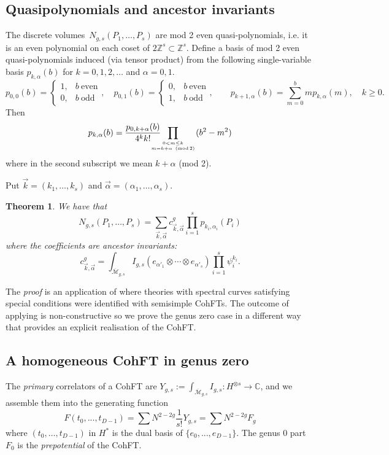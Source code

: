 \documentclass[11pt]{article}
\def\be{\begin{equation}}
\def\ee{\end{equation}}
\def\1N{${\cal N}=1$}
\newcommand{\bz}{\mathbb{Z}}
\newcommand{\modm}{\mathcal{M}}
\theoremstyle{plain}
\newtheorem{theorem}{Theorem}
\theoremstyle{definition}
\let\text=\mathrm
\newcommand{\bc}{\mathbb{C}}
\newcommand {\dvol}{discrete volumes}%
\begin{document}
\subsection{Quasipolynomials and ancestor invariants}\label{ss:quasi}
The \dvol\  $N_{g,s}(P_1,\dots,P_s)$ are mod 2 even quasi-polynomials, i.e. it is an even polynomial on each coset of $2\bz^s\subset\bz^s$.   Define a basis of mod 2 even quasi-polynomials induced (via tensor product) from the following single-variable basis $p_{k,\alpha}(b)$ for $k=0,1,2,\dots$ and $\alpha=0,1$.
$$p_{0,0}(b)=\left\{\begin{array}{cc}1,&b \text{\ even}\\0,&b \text{\ odd}\end{array}\right.,\quad p_{0,1}(b)=\left\{\begin{array}{cc}0,&b \text{\ even}\\1,&b \text{\ odd}\end{array}\right.,\qquad p_{k+1,\alpha}(b)=\sum_{m=0}^b m p_{k,\alpha}(m),\quad k\geq 0.$$
Then
\be
p_{k,\alpha}(b)=\frac{p_{0,k+\alpha}(b)}{4^kk!}\hspace{-.5cm}\prod_{{0<m\le k\atop m=k+\alpha\ (\mathrm{mod\,}2)}}(b^2-m^2)
\label{pk1}
\ee
where in the second subscript we mean $k+\alpha$ (mod 2).  


Put $\vec{k}=(k_1,\dots,k_s)$ and  $\vec{\alpha}=(\alpha_1,\dots,\alpha_s)$.
\begin{theorem} \label{th:cohft} We have that
$$N_{g,s}(P_1,\dots,P_s)=\sum_{\vec{k},\vec{\alpha}} c^g_{\vec{k},\vec{\alpha}} \prod_{i=1}^s p_{k_i,\alpha_i}(P_i)$$
where the coefficients are ancestor invariants:
\be
c^g_{\vec{k},\vec{\alpha}}=\int_{\overline{\modm}_{g,s}}I_{g,s}(e_{\alpha'_1}\otimes\cdots\otimes e_{\alpha'_s})\prod_{i=1}^s\psi_i^{k_i}.
\label{ancestor}
\ee 
\end{theorem}
The \emph{proof} is an application of \cite{DOSSIde} where theories with spectral curves satisfying special conditions were identified
with semisimple CohFTs. The outcome of applying \cite{DOSSIde} is non-constructive so we prove the genus zero case in a different way that provides an explicit realisation of the CohFT.

\subsection{A homogeneous CohFT in genus zero}

The {\em primary} correlators of a CohFT are 
$Y_{g,s}:=\int_{\overline{\modm}_{g,s}}I_{g,s}:H^{\otimes s}\to\bc$, and we assemble them into the generating function
$$
F(t_0,...,t_{D-1})=\sum N^{2-2g}\frac{1}{s!}Y_{g,s}=\sum N^{2-2g}F_g
$$
where $(t_0,\dots,t_{D-1})$ in $ H^*$ is the dual basis of $\{e_0,...,e_{D-1}\}$.  The genus 0 part $F_0$ is the 
\emph{prepotential} of the CohFT.
\end{document}
